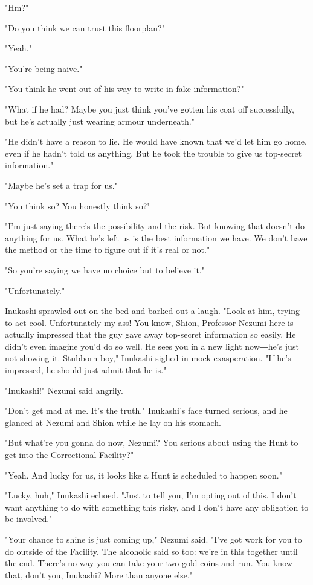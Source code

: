"Hm?"

"Do you think we can trust this floorplan?"

"Yeah."

"You're being naive."

"You think he went out of his way to write in fake information?"

"What if he had? Maybe you just think you've gotten his coat off
successfully, but he's actually just wearing armour underneath."

"He didn't have a reason to lie. He would have known that we'd let him
go home, even if he hadn't told us anything. But he took the trouble to
give us top-secret information."

"Maybe he's set a trap for us."

"You think so? You honestly think so?"

"I'm just saying there's the possibility and the risk. But knowing that
doesn't do anything for us. What he's left us is the best information we
have. We don't have the method or the time to figure out if it's real or
not."

"So you're saying we have no choice but to believe it."

"Unfortunately."

Inukashi sprawled out on the bed and barked out a laugh. "Look at him,
trying to act cool. Unfortunately my ass! You know, Shion, Professor
Nezumi here is actually impressed that the guy gave away top-secret
information so easily. He didn't even imagine you'd do so well. He sees
you in a new light now―he's just not showing it. Stubborn boy," Inukashi
sighed in mock exasperation. "If he's impressed, he should just admit
that he is."

"Inukashi!" Nezumi said angrily.

"Don't get mad at me. It's the truth." Inukashi's face turned serious,
and he glanced at Nezumi and Shion while he lay on his stomach.

"But what're you gonna do now, Nezumi? You serious about using the Hunt
to get into the Correctional Facility?"

"Yeah. And lucky for us, it looks like a Hunt is scheduled to happen
soon."

"Lucky, huh," Inukashi echoed. "Just to tell you, I'm opting out of
this. I don't want anything to do with something this risky, and I don't
have any obligation to be involved."

"Your chance to shine is just coming up," Nezumi said. "I've got work
for you to do outside of the Facility. The alcoholic said so too: we're
in this together until the end. There's no way you can take your two
gold coins and run. You know that, don't you, Inukashi? More than anyone
else."

